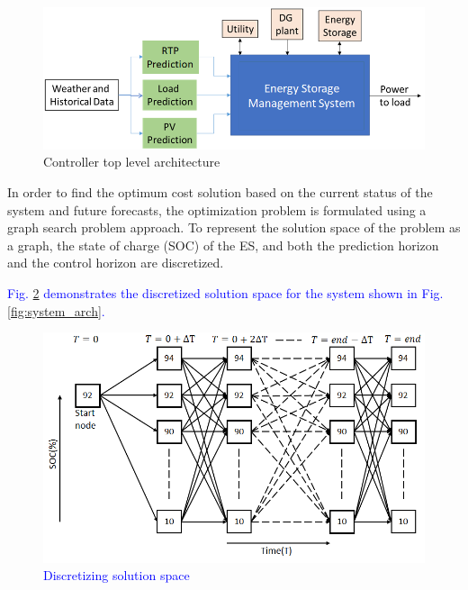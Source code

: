 \begin{figure}[!ht]
    \centering
    \includegraphics[width = 0.8\linewidth]{figs/EMS_FIG.png}
    \caption{Controller top level architecture}
    \label{fig:F1_CA}
\end{figure}

In order to find the optimum cost solution based on the current status of the system and future forecasts, the optimization problem is formulated using a graph search problem approach. To represent the solution space of the problem as a graph, the state of charge (SOC) of the ES, and both the prediction horizon and the control horizon are discretized. \textcolor{blue}{Fig. \ref{fig:F1_Dis} demonstrates the discretized solution space for the system shown in Fig. \ref{fig:system_arch}.
\begin{figure}[!ht]
    \centering
    \includegraphics[width = 0.8\linewidth]{figs/NEW_GRAPH_SEARCH.png}
    \caption{\textcolor{blue}{Discretizing solution space}}
    \label{fig:F1_Dis}
\end{figure}
}
